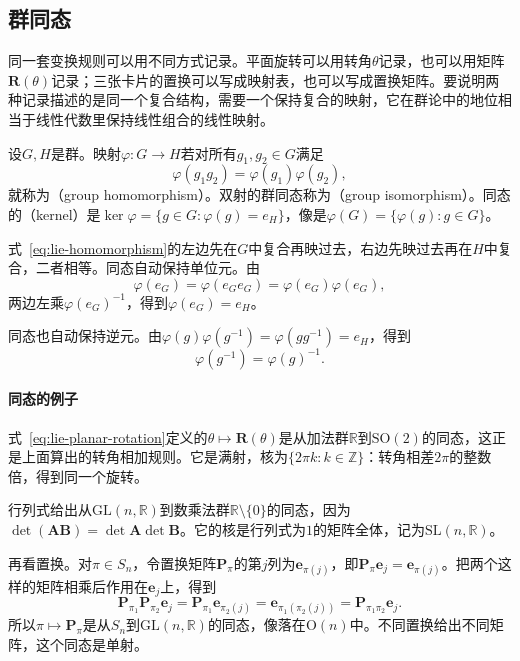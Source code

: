 \subsection{群同态}
\label{sec:lie-homomorphism}

同一套变换规则可以用不同方式记录。平面旋转可以用转角$\theta$记录，也可以用矩阵$\bm R(\theta)$记录；三张卡片的置换可以写成映射表，也可以写成置换矩阵。要说明两种记录描述的是同一个复合结构，需要一个保持复合的映射，它在群论中的地位相当于线性代数里保持线性组合的线性映射。

\begin{definition}[群同态与同构]
\label{def:lie-homomorphism}
设$G,H$是群。映射$\varphi:G\to H$若对所有$g_1,g_2\in G$满足
\begin{equation}
 \varphi(g_1g_2)=\varphi(g_1)\varphi(g_2),
 \label{eq:lie-homomorphism}
\end{equation}
就称为（group homomorphism）。双射的群同态称为（group isomorphism）。同态的（kernel）是$\ker\varphi=\{g\in G:\varphi(g)=e_H\}$，像是$\varphi(G)=\{\varphi(g):g\in G\}$。
\end{definition}

式~\eqref{eq:lie-homomorphism}的左边先在$G$中复合再映过去，右边先映过去再在$H$中复合，二者相等。同态自动保持单位元。由
\[
\varphi(e_G)=\varphi(e_Ge_G)=\varphi(e_G)\varphi(e_G),
\]
两边左乘$\varphi(e_G)^{-1}$，得到$\varphi(e_G)=e_H$。

同态也自动保持逆元。由$\varphi(g)\varphi(g^{-1})=\varphi(gg^{-1})=e_H$，得到
\[
\varphi(g^{-1})=\varphi(g)^{-1}.
\]

\paragraph{同态的例子}
式~\eqref{eq:lie-planar-rotation}定义的$\theta\mapsto\bm R(\theta)$是从加法群$\mathbb R$到$\mathrm{SO}(2)$的同态，这正是上面算出的转角相加规则。它是满射，核为$\{2\pi k:k\in\mathbb Z\}$：转角相差$2\pi$的整数倍，得到同一个旋转。

行列式给出从$\mathrm{GL}(n,\mathbb R)$到数乘法群$\mathbb R\setminus\{0\}$的同态，因为$\det(\bm A\bm B)=\det\bm A\det\bm B$。它的核是行列式为$1$的矩阵全体，记为$\mathrm{SL}(n,\mathbb R)$。

再看置换。对$\pi\in S_n$，令置换矩阵$\bm P_\pi$的第$j$列为$\bm e_{\pi(j)}$，即$\bm P_\pi\bm e_j=\bm e_{\pi(j)}$。把两个这样的矩阵相乘后作用在$\bm e_j$上，得到
\[
\bm P_{\pi_1}\bm P_{\pi_2}\bm e_j
=\bm P_{\pi_1}\bm e_{\pi_2(j)}
=\bm e_{\pi_1(\pi_2(j))}
=\bm P_{\pi_1\pi_2}\bm e_j .
\]
所以$\pi\mapsto\bm P_\pi$是从$S_n$到$\mathrm{GL}(n,\mathbb R)$的同态，像落在$\mathrm O(n)$中。不同置换给出不同矩阵，这个同态是单射。


